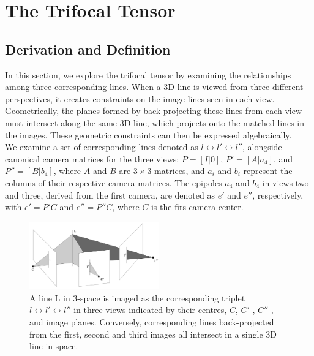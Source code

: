 \section{The Trifocal Tensor}\label{sec:tft}

\subsection{Derivation and Definition}
In this section, we explore the trifocal tensor by examining the relationships among three corresponding lines. When a 3D line is viewed from three different perspectives, it creates constraints on the image lines seen in each view. Geometrically, the planes formed by back-projecting these lines from each view must intersect along the same 3D line, which projects onto the matched lines in the images. These geometric constraints can then be expressed algebraically.\\

We examine a set of corresponding lines denoted as \( l \leftrightarrow l' \leftrightarrow l'' \), alongside canonical camera matrices for the three views: \( P = [I|0] \), \( P' = [A|a_4] \), and \( P'' = [B|b_4] \), where \( A \) and \( B \) are \( 3 \times 3 \) matrices, and \( a_i \) and \( b_i \) represent the columns of their respective camera matrices. The epipoles \( a_4 \) and \( b_4 \) in views two and three, derived from the first camera, are denoted as \( e' \) and \( e'' \), respectively, with \( e' = P'C \) and \( e'' = P''C \), where \( C \) is the firs camera center.

\begin{figure}[h]
	\centering
	\includegraphics[width=0.5\textwidth]{Report/Figures/three-views.png}
	\caption[Trifocal Tensor Derivation]{A line L in 3-space is imaged as the corresponding triplet \( l \leftrightarrow l' \leftrightarrow l'' \) in three views indicated by their centres, \( C \), \( C' \) , \( C'' \) , and image planes. Conversely, corresponding lines back-projected from the first, second and third images all intersect in a single 3D line in space. \cite{1-multiple-view-geometry}}
\end{figure}

